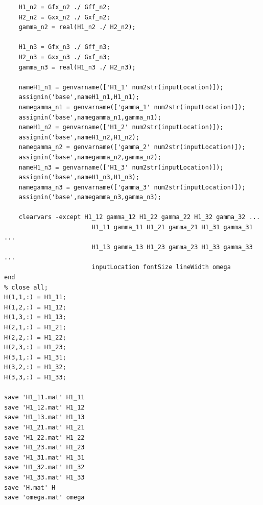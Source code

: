 \documentclass[paper=a4, fontsize=12pt]{scrartcl} %
\begin{document}
\begin{lstlisting}
    H1_n2 = Gfx_n2 ./ Gff_n2;
    H2_n2 = Gxx_n2 ./ Gxf_n2;
    gamma_n2 = real(H1_n2 ./ H2_n2);

    H1_n3 = Gfx_n3 ./ Gff_n3;
    H2_n3 = Gxx_n3 ./ Gxf_n3;
    gamma_n3 = real(H1_n3 ./ H2_n3);

    nameH1_n1 = genvarname(['H1_1' num2str(inputLocation)]);
    assignin('base',nameH1_n1,H1_n1);
    namegamma_n1 = genvarname(['gamma_1' num2str(inputLocation)]);
    assignin('base',namegamma_n1,gamma_n1);
    nameH1_n2 = genvarname(['H1_2' num2str(inputLocation)]);
    assignin('base',nameH1_n2,H1_n2);
    namegamma_n2 = genvarname(['gamma_2' num2str(inputLocation)]);
    assignin('base',namegamma_n2,gamma_n2);
    nameH1_n3 = genvarname(['H1_3' num2str(inputLocation)]);
    assignin('base',nameH1_n3,H1_n3);
    namegamma_n3 = genvarname(['gamma_3' num2str(inputLocation)]);
    assignin('base',namegamma_n3,gamma_n3);

    clearvars -except H1_12 gamma_12 H1_22 gamma_22 H1_32 gamma_32 ...
                        H1_11 gamma_11 H1_21 gamma_21 H1_31 gamma_31 ...
                        H1_13 gamma_13 H1_23 gamma_23 H1_33 gamma_33 ...
                        inputLocation fontSize lineWidth omega
end
% close all;
H(1,1,:) = H1_11;
H(1,2,:) = H1_12;
H(1,3,:) = H1_13;
H(2,1,:) = H1_21;
H(2,2,:) = H1_22;
H(2,3,:) = H1_23;
H(3,1,:) = H1_31;
H(3,2,:) = H1_32;
H(3,3,:) = H1_33;

save 'H1_11.mat' H1_11
save 'H1_12.mat' H1_12
save 'H1_13.mat' H1_13
save 'H1_21.mat' H1_21
save 'H1_22.mat' H1_22
save 'H1_23.mat' H1_23
save 'H1_31.mat' H1_31
save 'H1_32.mat' H1_32
save 'H1_33.mat' H1_33
save 'H.mat' H
save 'omega.mat' omega
\end{lstlisting}
\end{document}
